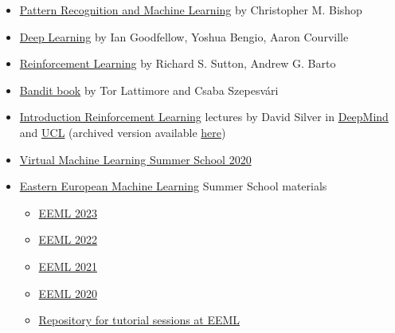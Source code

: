 \documentclass{article}
\begin{document}
\begin{itemize}
\begin{itemize}
\begin{itemize}
        \item \href{https://www.goodreads.com/book/show/55881.Pattern_Recognition_and_Machine_Learning}{Pattern Recognition and Machine Learning} by Christopher M. Bishop
        
        \item \href{https://www.goodreads.com/book/show/24072897-deep-learning}{Deep Learning} by Ian Goodfellow, Yoshua Bengio, Aaron Courville
        
        \item \href{https://www.goodreads.com/book/show/739791.Reinforcement_Learning}{Reinforcement Learning} by Richard S. Sutton, Andrew G. Barto
        
        \item \href{https://tor-lattimore.com/downloads/book/book.pdf}{Bandit book} by Tor Lattimore and Csaba Szepesvári
        
        \item \href{https://www.davidsilver.uk/teaching/}{Introduction Reinforcement Learning} lectures by David Silver in \href{https://deepmind.com/}{DeepMind} and \href{https://www.ucl.ac.uk/}{UCL} (archived version available \href{https://web.archive.org/web/20201229092911/https://deepmind.com/learning-resources/-introduction-reinforcement-learning-david-silver}{here})
        \item \href{https://www.youtube.com/channel/UCBOgpkDhQuYeVVjuzS5Wtxw}{Virtual Machine Learning Summer School 2020}
        \item \href{https://www.eeml.eu/}{Eastern European Machine Learning} Summer School materials
        \begin{itemize}
            \item \href{https://www.youtube.com/playlist?list=PLaKY4p4V3gE3QP8iMZRcCL4anfzq5HxW7}{EEML 2023}
            \item \href{https://www.youtube.com/playlist?list=PLaKY4p4V3gE1Jhf39OpPNEXIchI_0bZCa}{EEML 2022}
            \item \href{https://www.youtube.com/playlist?list=PLrxx_KalQ58_iORLAEbTh5O0SxUUgAydy}{EEML 2021}
            \item \href{https://www.youtube.com/playlist?list=PLaKY4p4V3gE1j01FOY2FeglV4jRntQj84}{EEML 2020}

            \item \href{https://github.com/eemlcommunity}{Repository for tutorial sessions at EEML}
        \end{itemize}


\end{itemize}
\end{itemize}
\end{itemize}
\end{document}
